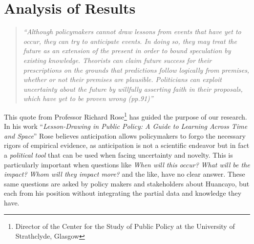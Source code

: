 \documentclass{article}
\begin{document}
\section{Analysis of Results}


\begin{quote}
\emph{``Although policymakers cannot draw lessons from events that have yet to occur, they can try to anticipate events. In doing so, they may treat the future as an extension of the present in order to bound speculation by existing knowledge. Theorists can claim future success for their prescriptions on the grounds that predictions follow logically from premises, whether or not their premises are plausible. Politicians can exploit uncertainty about the future by willfully asserting faith in their proposals, which have yet to be proven wrong (pp.91)''\cite{rose_lesson-drawing_1993}}
\end{quote}

This quote from Professor Richard Rose\footnote{Director of the Center for the Study of Public Policy at the University of Strathclyde, Glasgow} has guided the purpose of our research. In his work ``\emph{Lesson-Drawing in Public Policy: A Guide to Learning Across Time and Space}'' Rose believes anticipation allows policymakers to forgo the necessary rigors of empirical evidence, as anticipation is not a scientific endeavor but in fact a \emph{political tool} that can be used when facing uncertainty and novelty. This is particularly important when questions like \emph{When will this occur?} \emph{What will be the impact?} \emph{Whom will they impact more?}  and the like, have no clear answer. These same questions are asked by policy makers and stakeholders about Huancayo, but each from his position without integrating the partial data and knowledge they have.
\end{document}
